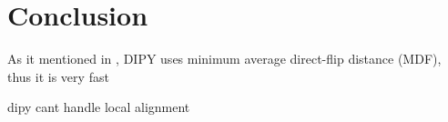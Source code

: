 \documentclass[../structure.tex]{subfiles}
\begin{document}
\chapter{Conclusion}
As it mentioned in \cite{ODonnell2012}, DIPY uses minimum average direct-flip distance (MDF), thus it is very fast

dipy cant handle local alignment
\end{document}

